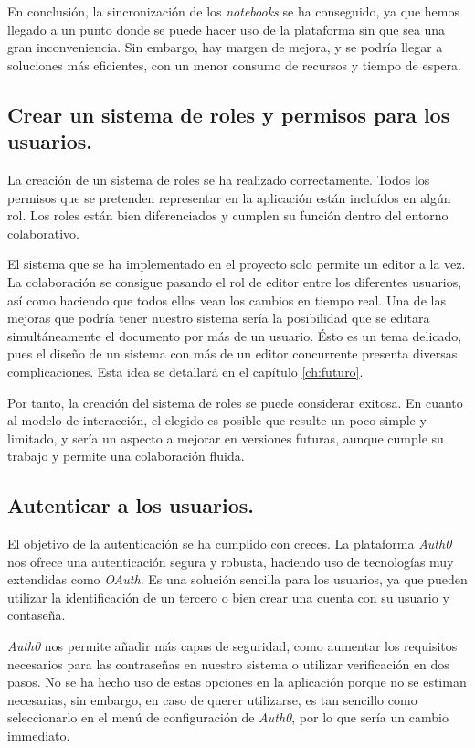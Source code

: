 \documentclass[11pt,spanish,listoffigures]{tfgetsinf}
\begin{document}
En conclusión, la sincronización de los \textit{notebooks} se ha conseguido, ya que hemos llegado a un punto donde se puede hacer uso de la plataforma sin que sea una gran inconveniencia. Sin embargo, hay margen de mejora, y se podría llegar a soluciones más eficientes, con un menor consumo de recursos y tiempo de espera.

\subsection{Crear un sistema de roles y permisos para los usuarios.}
\label{subsec:objetivos-conc-roles}

La creación de un sistema de roles se ha realizado correctamente. Todos los permisos que se pretenden representar en la aplicación están incluídos en algún rol. Los roles están bien diferenciados y cumplen su función dentro del entorno colaborativo. 

El sistema que se ha implementado en el proyecto solo permite un editor a la vez. La colaboración se consigue pasando el rol de editor entre los diferentes usuarios, así como haciendo que todos ellos vean los cambios en tiempo real. Una de las mejoras que podría tener nuestro sistema sería la posibilidad que se editara simultáneamente el documento por más de un usuario. Ésto es un tema delicado, pues el diseño de un sistema con más de un editor concurrente presenta diversas complicaciones. Esta idea se detallará en el capítulo \ref{ch:futuro}.

Por tanto, la creación del sistema de roles se puede considerar exitosa. En cuanto al modelo de interacción, el elegido es posible que resulte un poco simple y limitado, y sería un aspecto a mejorar en versiones futuras, aunque cumple su trabajo y permite una colaboración fluida. 

\subsection{Autenticar a los usuarios.}
\label{subsec:objetivos-conc-auth}

El objetivo de la autenticación se ha cumplido con creces. La plataforma \textit{Auth0} nos ofrece una autenticación segura y robusta, haciendo uso de tecnologías muy extendidas como \textit{OAuth}. Es una solución sencilla para los usuarios, ya que pueden utilizar la identificación de un tercero o bien crear una cuenta con su usuario y contaseña. 

\textit{Auth0} nos permite añadir más capas de seguridad, como aumentar los requisitos necesarios para las contraseñas en nuestro sistema o utilizar verificación en dos pasos. No se ha hecho uso de estas opciones en la aplicación porque no se estiman necesarias, sin embargo, en caso de querer utilizarse, es tan sencillo como seleccionarlo en el menú de configuración de \textit{Auth0}, por lo que sería un cambio immediato.
\end{document}
